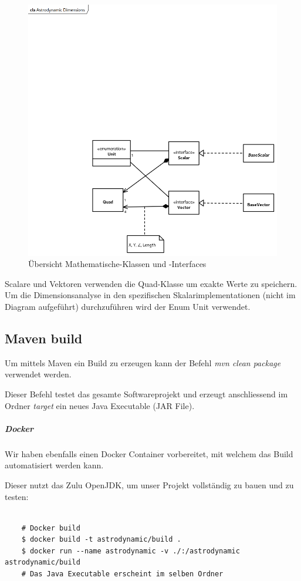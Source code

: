 \begin{figure}[H]
	\centering
	\includegraphics[width=12cm]{res/AstrodynamicDimensions.png}
	\caption{Übersicht Mathematische-Klassen und -Interfaces}
\end{figure}

Scalare und Vektoren verwenden die Quad-Klasse um exakte Werte zu speichern. Um die Dimensionsanalyse in den spezifischen Skalarimplementationen (nicht im Diagram aufgeführt) durchzuführen wird der Enum Unit verwendet.

\subsection{Maven build}

Um mittels Maven ein Build zu erzeugen kann der Befehl \textit{mvn clean package} verwendet werden.

Dieser Befehl testet das gesamte Softwareprojekt und erzeugt anschliessend im Ordner \textit{target} ein neues Java Executable (JAR File).

\subparagraph{Docker}

Wir haben ebenfalls einen Docker Container vorbereitet, mit welchem das Build automatisiert werden kann.

Dieser nutzt das Zulu OpenJDK, um unser Projekt vollständig zu bauen und zu testen:

\begin{lstlisting}

	# Docker build
	$ docker build -t astrodynamic/build .
	$ docker run --name astrodynamic -v ./:/astrodynamic astrodynamic/build
	# Das Java Executable erscheint im selben Ordner
	
\end{lstlisting}

